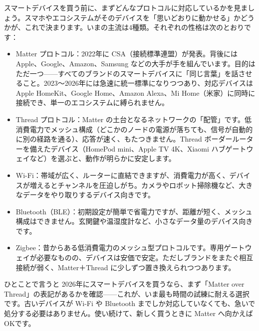 


スマートデバイスを買う前に、まずどんなプロトコルに対応しているかを見ましょう。スマホやエコシステムがそのデバイスを「思いどおりに動かせる」かどうかが、これで決まります。いまの主流は4種類。それぞれの性格は次のとおりです：

\begin{itemize}
  \item Matter プロトコル：2022年に CSA（接続標準連盟）が発表。背後には Apple、Google、Amazon、Samsung などの大手が手を組んでいます。目的はただ一つ——すべてのブランドのスマートデバイスに「同じ言葉」を話させること。2023〜2026年には急速に統一標準になりつつあり、対応デバイスは Apple HomeKit、Google Home、Amazon Alexa、Mi Home（米家）に同時に接続でき、単一のエコシステムに縛られません。
  \item Thread プロトコル：Matter の土台となるネットワークの「配管」です。低消費電力でメッシュ構成（どこかのノードの電源が落ちても、信号が自動的に別の経路を通る）、応答が速く、もたつきません。Thread ボーダールーターを備えたデバイス（HomePod mini、Apple TV 4K、Xiaomi ハブゲートウェイなど）を選ぶと、動作が明らかに安定します。
  \item Wi-Fi：帯域が広く、ルーターに直結できますが、消費電力が高く、デバイスが増えるとチャンネルを圧迫しがち。カメラやロボット掃除機など、大きなデータをやり取りするデバイス向きです。
  \item Bluetooth（BLE）：初期設定が簡単で省電力ですが、距離が短く、メッシュ構成はできません。玄関鍵や温湿度計など、小さなデータ量のデバイス向きです。
  \item Zigbee：昔からある低消費電力のメッシュ型プロトコルです。専用ゲートウェイが必要なものの、デバイスは安価で安定。ただしブランドをまたぐ相互接続が弱く、Matter＋Thread に少しずつ置き換えられつつあります。
\end{itemize}

\begin{tcbinfo}{ひとことで言うと}
2026年にスマートデバイスを買うなら、まず「Matter over Thread」の表記があるかを確認——これが、いま最も時間の試練に耐える選択です。古いデバイスが Wi-Fi や Bluetooth までしか対応していなくても、急いで処分する必要はありません。使い続けて、新しく買うときに Matter へ向かえばOKです。

\end{tcbinfo}

